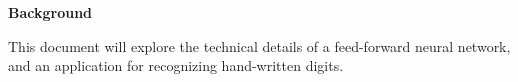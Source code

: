 \documentclass[12pt]{article}
\begin{document}
\Large
{\bf Background}

\normalsize
This document will explore the technical details of a feed-forward 
neural network, and an application for recognizing hand-written digits.



\end{document}
